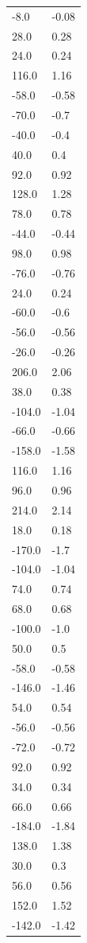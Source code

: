 \begin{longtable}{ll}
-8.0 & -0.08 \\
28.0 & 0.28 \\
24.0 & 0.24 \\
116.0 & 1.16 \\
-58.0 & -0.58 \\
-70.0 & -0.7 \\
-40.0 & -0.4 \\
40.0 & 0.4 \\
92.0 & 0.92 \\
128.0 & 1.28 \\
78.0 & 0.78 \\
-44.0 & -0.44 \\
98.0 & 0.98 \\
-76.0 & -0.76 \\
24.0 & 0.24 \\
-60.0 & -0.6 \\
-56.0 & -0.56 \\
-26.0 & -0.26 \\
206.0 & 2.06 \\
38.0 & 0.38 \\
-104.0 & -1.04 \\
-66.0 & -0.66 \\
-158.0 & -1.58 \\
116.0 & 1.16 \\
96.0 & 0.96 \\
214.0 & 2.14 \\
18.0 & 0.18 \\
-170.0 & -1.7 \\
-104.0 & -1.04 \\
74.0 & 0.74 \\
68.0 & 0.68 \\
-100.0 & -1.0 \\
50.0 & 0.5 \\
-58.0 & -0.58 \\
-146.0 & -1.46 \\
54.0 & 0.54 \\
-56.0 & -0.56 \\
-72.0 & -0.72 \\
92.0 & 0.92 \\
34.0 & 0.34 \\
66.0 & 0.66 \\
-184.0 & -1.84 \\
138.0 & 1.38 \\
30.0 & 0.3 \\
56.0 & 0.56 \\
152.0 & 1.52 \\
-142.0 & -1.42 \\

\end{longtable}
